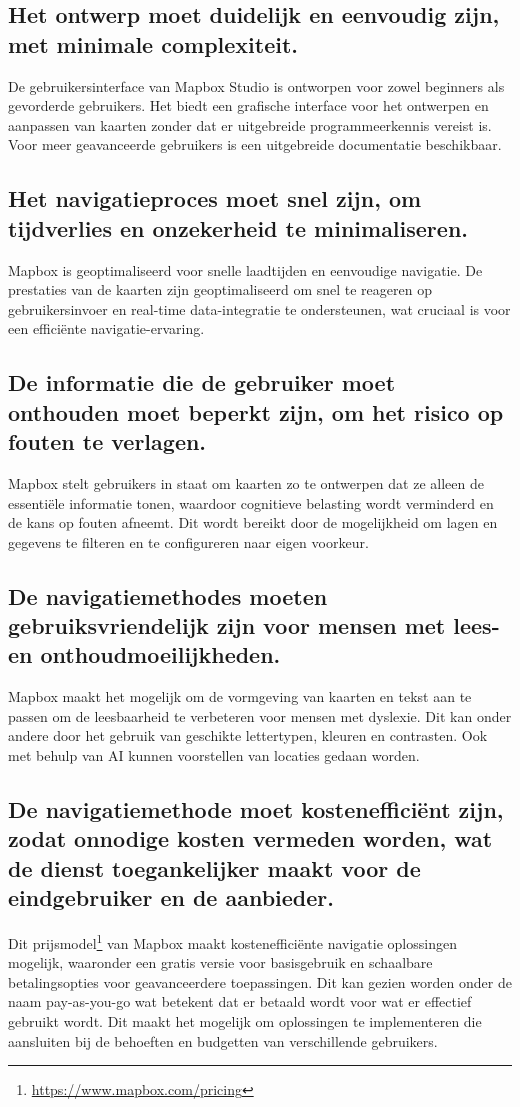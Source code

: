 \subsection*{Het ontwerp moet duidelijk en eenvoudig zijn, met minimale complexiteit.}
De gebruikersinterface van Mapbox Studio is ontworpen voor zowel beginners als gevorderde gebruikers. Het biedt een grafische interface voor het ontwerpen en aanpassen van kaarten zonder dat er uitgebreide programmeerkennis vereist is. Voor meer geavanceerde gebruikers is een uitgebreide documentatie beschikbaar.
\subsection*{Het navigatieproces moet snel zijn, om tijdverlies en onzekerheid te minimaliseren.}
Mapbox is geoptimaliseerd voor snelle laadtijden en eenvoudige navigatie. De prestaties van de kaarten zijn geoptimaliseerd om snel te reageren op gebruikersinvoer en real-time data-integratie te ondersteunen, wat cruciaal is voor een efficiënte navigatie-ervaring.
\subsection*{De informatie die de gebruiker moet onthouden moet beperkt zijn, om het risico op fouten te verlagen.}
Mapbox stelt gebruikers in staat om kaarten zo te ontwerpen dat ze alleen de essentiële informatie tonen, waardoor cognitieve belasting wordt verminderd en de kans op fouten afneemt. Dit wordt bereikt door de mogelijkheid om lagen en gegevens te filteren en te configureren naar eigen voorkeur.
\subsection*{De navigatiemethodes moeten gebruiksvriendelijk zijn voor mensen met lees- en onthoudmoeilijkheden.}
Mapbox maakt het mogelijk om de vormgeving van kaarten en tekst aan te passen om de leesbaarheid te verbeteren voor mensen met dyslexie. Dit kan onder andere door het gebruik van geschikte lettertypen, kleuren en contrasten. Ook met behulp van AI kunnen voorstellen van locaties gedaan worden.
\subsection*{De navigatiemethode moet kostenefficiënt zijn, zodat onnodige kosten vermeden worden, wat de dienst toegankelijker maakt voor de eindgebruiker en de aanbieder.}
Dit prijsmodel\footnote{\url{https://www.mapbox.com/pricing}} van Mapbox maakt kostenefficiënte navigatie oplossingen mogelijk, waaronder een gratis versie voor basisgebruik en schaalbare betalingsopties voor geavanceerdere toepassingen. Dit kan gezien worden onder de naam pay-as-you-go wat betekent dat er betaald wordt voor wat er effectief gebruikt wordt. Dit maakt het mogelijk om oplossingen te implementeren die aansluiten bij de behoeften en budgetten van verschillende gebruikers. 

